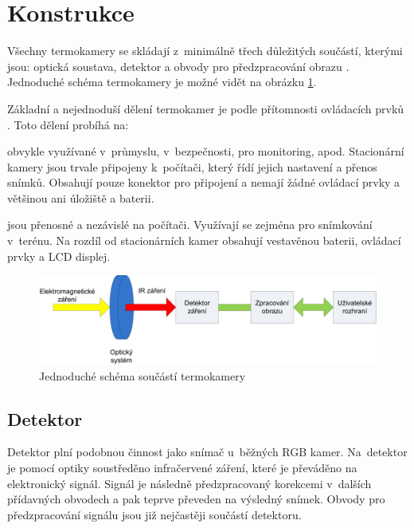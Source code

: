 \section{Konstrukce}
Všechny termokamery se skládají z~minimálně třech důležitých součástí, kterými jsou: optická soustava, detektor a obvody pro předzpracování obrazu \cite{jakl2011experimentalni,smrvz2013bezkontaktni,malik2012zpracovani}. Jednoduché schéma termokamery je možné vidět na obrázku \ref{fig:thermal_camera_scheme}. 

Základní a nejednoduší dělení termokamer je podle přítomnosti ovládacích prvků \cite{kuvzel2010bezkontaktni}. Toto dělení probíhá na:

\begin{description}[align=left]
  \item [Stacionární termokamery] obvykle využívané v~průmyslu, v~bezpečnosti, pro monitoring, apod. Stacionární kamery jsou  trvale připojeny k~počítači, který řídí jejich nastavení a přenos snímků. Obsahují pouze konektor pro připojení a nemají žádné ovládací prvky a většinou ani úložiště a baterii.
  \item [Ruční termokamery] jsou přenosné a nezávislé na počítači. Využívají se zejména pro snímkování v~terénu. Na rozdíl od stacionárních kamer obsahují vestavěnou baterii, ovládací prvky a LCD displej.
\end{description}
    
\begin{figure}[h]
  \centering
  \includegraphics[width=1\textwidth]{images/konstrukce_kamery.png}
  \caption{Jednoduché schéma součástí termokamery \cite{konstrukcetermokamery}}
  \label{fig:thermal_camera_scheme}
\end{figure}
    
    \subsection{Detektor}
    Detektor  plní podobnou činnost jako snímač u~běžných RGB kamer. Na~detektor je pomocí optiky soustředěno infračervené záření, které je převáděno na elektronický signál. Signál je následně předzpracovaný korekcemi v~dalších přídavných obvodech a pak teprve převeden na výsledný snímek. Obvody pro předzpracování signálu jsou již nejčastěji součástí detektoru. \cite{smrvz2013bezkontaktni}
    
